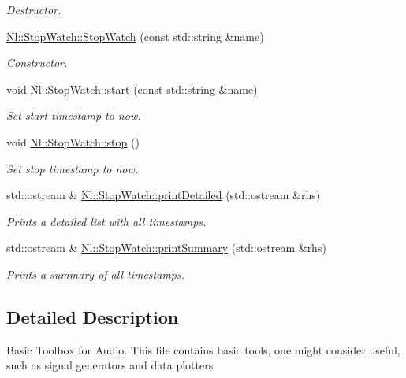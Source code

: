 \begin{DoxyCompactItemize}
\begin{DoxyCompactList}\small\item\em Destructor. \end{DoxyCompactList}\item 
\hyperlink{group__Tools_ga086b4f40c93978f661d5154f31081677}{Nl\-::\-Stop\-Watch\-::\-Stop\-Watch} (const std\-::string \&name)
\begin{DoxyCompactList}\small\item\em Constructor. \end{DoxyCompactList}\item 
void \hyperlink{group__Tools_ga0171f821750460729b49db731d20e214}{Nl\-::\-Stop\-Watch\-::start} (const std\-::string \&name)
\begin{DoxyCompactList}\small\item\em Set start timestamp to now. \end{DoxyCompactList}\item 
void \hyperlink{group__Tools_ga2b770511bceacff939c8bbf69e25445f}{Nl\-::\-Stop\-Watch\-::stop} ()
\begin{DoxyCompactList}\small\item\em Set stop timestamp to now. \end{DoxyCompactList}\item 
std\-::ostream \& \hyperlink{group__Tools_gacd1b3793ab5f126af64122dcfabf1020}{Nl\-::\-Stop\-Watch\-::print\-Detailed} (std\-::ostream \&rhs)
\begin{DoxyCompactList}\small\item\em Prints a detailed list with all timestamps. \end{DoxyCompactList}\item 
std\-::ostream \& \hyperlink{group__Tools_ga8d07863904ca88de29fe3906ee1ae0a6}{Nl\-::\-Stop\-Watch\-::print\-Summary} (std\-::ostream \&rhs)
\begin{DoxyCompactList}\small\item\em Prints a summary of all timestamps. \end{DoxyCompactList}\end{DoxyCompactItemize}


\subsection{Detailed Description}
Basic Toolbox for Audio. This file contains basic tools, one might consider useful, such as signal generators and data plotters 


